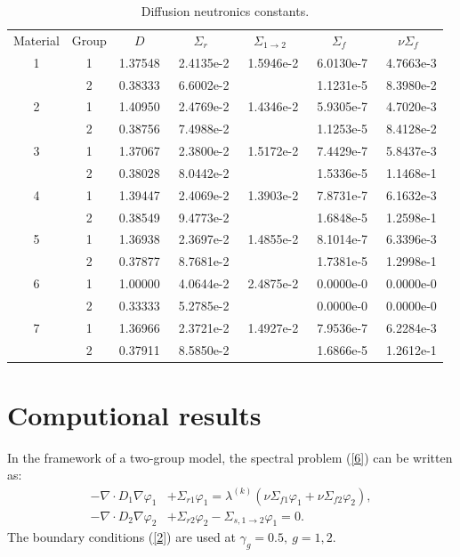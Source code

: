 \documentclass[runningheads,a4paper]{llncs}
\begin{document}
\begin{table}[h]
\caption{Diffusion neutronics constants.}
\label{t-1}
\begin{center}
\begin{tabular}{ccrrrrr}
\rowcolor{col1}
Material & Group & \multicolumn{1}{c}{$D$} & \multicolumn{1}{c}{$\Sigma_r$} & \multicolumn{1}{c}{$\Sigma_{1\to 2}$} & \multicolumn{1}{c}{$\Sigma_f$}& \multicolumn{1}{c}{$\nu\Sigma_f$}\\
\rowcolor{col3}
1 & 1 & 1.37548 & ~2.4135e-2 & ~1.5946e-2 & ~6.0130e-7 & ~4.7663e-3 \\
\rowcolor{col2}
  & 2 & 0.38333 & 6.6002e-2 &           & 1.1231e-5 & 8.3980e-2 \\
\rowcolor{col3}
2 & 1 & 1.40950 & 2.4769e-2 & 1.4346e-2 & 5.9305e-7 & 4.7020e-3 \\
\rowcolor{col2}
  & 2 & 0.38756 & 7.4988e-2 &           & 1.1253e-5 & 8.4128e-2 \\
\rowcolor{col3}
3 & 1 & 1.37067 & 2.3800e-2 & 1.5172e-2 & 7.4429e-7 & 5.8437e-3 \\
\rowcolor{col2}
  & 2 & 0.38028 & 8.0442e-2 &           & 1.5336e-5 & 1.1468e-1 \\
\rowcolor{col3}
4 & 1 & 1.39447 & 2.4069e-2 & 1.3903e-2 & 7.8731e-7 & 6.1632e-3 \\
\rowcolor{col2}
  & 2 & 0.38549 & 9.4773e-2 &           & 1.6848e-5 & 1.2598e-1 \\
\rowcolor{col3}
5 & 1 & 1.36938 & 2.3697e-2 & 1.4855e-2 & 8.1014e-7 & 6.3396e-3 \\
\rowcolor{col2}
  & 2 & 0.37877 & 8.7681e-2 &           & 1.7381e-5 & 1.2998e-1 \\
\rowcolor{col3}
6 & 1 & 1.00000 & 4.0644e-2 & 2.4875e-2 & 0.0000e-0 & 0.0000e-0 \\
\rowcolor{col2}
  & 2 & 0.33333 & 5.2785e-2 &           & 0.0000e-0 & 0.0000e-0 \\
\rowcolor{col3}
7 & 1 & 1.36966 & 2.3721e-2 & 1.4927e-2 & 7.9536e-7 & 6.2284e-3 \\
\rowcolor{col2}
  & 2 & 0.37911 & 8.5850e-2 &           & 1.6866e-5 & 1.2612e-1 \\

\end{tabular}
\end{center}
\end{table}

\section{Computional results}
In the framework of a two-group model, the spectral problem (\ref{6}) can be written as:
\begin{equation}\label{7}
\begin{split}
 - \nabla \cdot D_1 \nabla \varphi_1 & + \Sigma_{r1} \varphi_1  
 = \lambda^{(k)} (\nu \Sigma_{f1} \varphi_1 + \nu \Sigma_{f2} \varphi_2), \\
 - \nabla \cdot D_2 \nabla \varphi_2 & + \Sigma_{r2} \varphi_2 - \Sigma_{s,1\rightarrow 2} \varphi_1  
 = 0.
\end{split}
\end{equation}
The boundary conditions (\ref{2}) are used at $\gamma_g = 0.5, \ g = 1,2$.
\end{document}
